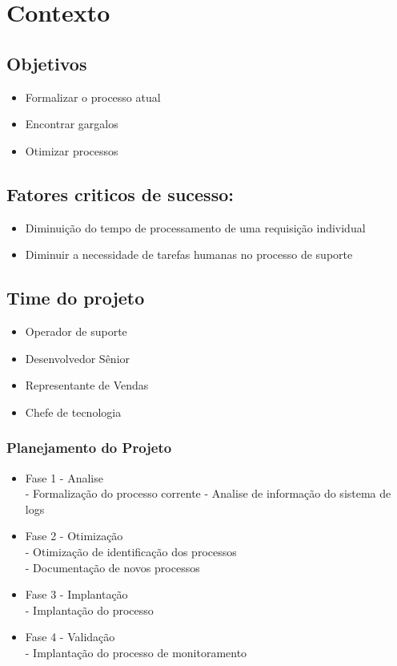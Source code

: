 \documentclass[11pt,a4paper]{article}
\begin{document}
\section{Contexto}
\subsection{Objetivos}
\begin{itemize}
  \item Formalizar o processo atual
  \item Encontrar gargalos
  \item Otimizar processos
\end{itemize}

\subsection{Fatores criticos de sucesso:}
\begin{itemize}
  \item Diminuição do tempo de processamento de uma requisição individual
  \item Diminuir a necessidade de tarefas humanas no processo de suporte
\end{itemize}

\subsection{Time do projeto}
\begin{itemize}
  \item Operador de suporte
  \item Desenvolvedor Sênior
  \item Representante de Vendas
  \item Chefe de tecnologia
\end{itemize}


\subsubsection{Planejamento do Projeto}
\begin{itemize}
\item Fase 1 - Analise \\
	- Formalização do processo corrente
	- Analise de informação do sistema de logs
\item Fase 2 - Otimização\\
	- Otimização de identificação dos processos\\
	- Documentação de novos processos
\item Fase 3 - Implantação \\
	- Implantação do processo\\
\item Fase 4 - Validação\\
	- Implantação do processo de monitoramento
\end{itemize}
\end{document}
